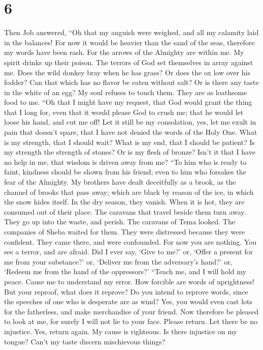 \hypertarget{section-5}{%
\section{6}\label{section-5}}

 Then Job answered,  ``Oh that my anguish
were weighed, and all my calamity laid in the balances! 
For now it would be heavier than the sand of the seas, therefore my
words have been rash.  For the arrows of the Almighty are
within me. My spirit drinks up their poison. The terrors of God set
themselves in array against me.  Does the wild donkey bray
when he has grass? Or does the ox low over his fodder? 
Can that which has no flavor be eaten without salt? Or is there any
taste in the white of an egg?  My soul refuses to touch
them. They are as loathsome food to me.  ``Oh that I might
have my request, that God would grant the thing that I long for,
 even that it would please God to crush me; that he would
let loose his hand, and cut me off!  Let it still be my
consolation, yes, let me exult in pain that doesn't spare, that I have
not denied the words of the Holy One.  What is my
strength, that I should wait? What is my end, that I should be patient?
 Is my strength the strength of stones? Or is my flesh of
bronze?  Isn't it that I have no help in me, that wisdom
is driven away from me?  ``To him who is ready to faint,
kindness should be shown from his friend; even to him who forsakes the
fear of the Almighty.  My brothers have dealt deceitfully
as a brook, as the channel of brooks that pass away; 
which are black by reason of the ice, in which the snow hides itself.
 In the dry season, they vanish. When it is hot, they are
consumed out of their place.  The caravans that travel
beside them turn away. They go up into the waste, and perish.
 The caravans of Tema looked. The companies of Sheba
waited for them.  They were distressed because they were
confident. They came there, and were confounded.  For now
you are nothing. You see a terror, and are afraid.  Did I
ever say, `Give to me?' or, `Offer a present for me from your
substance?'  or, `Deliver me from the adversary's hand?'
or, `Redeem me from the hand of the oppressors?'  ``Teach
me, and I will hold my peace. Cause me to understand my error.
 How forcible are words of uprightness! But your reproof,
what does it reprove?  Do you intend to reprove words,
since the speeches of one who is desperate are as wind? 
Yes, you would even cast lots for the fatherless, and make merchandise
of your friend.  Now therefore be pleased to look at me,
for surely I will not lie to your face.  Please return.
Let there be no injustice. Yes, return again. My cause is righteous.
 Is there injustice on my tongue? Can't my taste discern
mischievous things?

